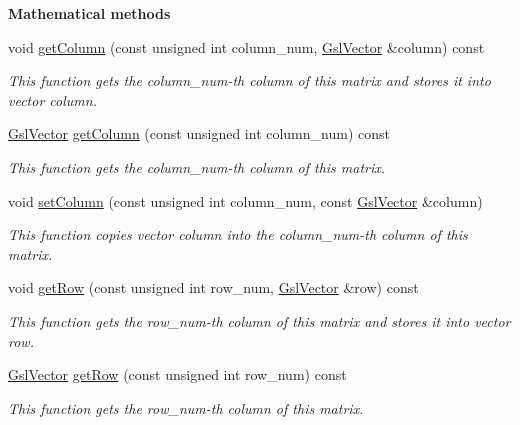 \begin{Indent}{\bf Mathematical methods}
\begin{DoxyCompactItemize}
void \hyperlink{class_q_u_e_s_o_1_1_gsl_matrix_a66db756823b03b5a66814c6868317669}{get\-Column} (const unsigned int column\-\_\-num, \hyperlink{class_q_u_e_s_o_1_1_gsl_vector}{Gsl\-Vector} \&column) const 
\begin{DoxyCompactList}\small\item\em This function gets the column\-\_\-num-\/th column of {\ttfamily this} matrix and stores it into vector {\ttfamily column}. \end{DoxyCompactList}\item 
\hyperlink{class_q_u_e_s_o_1_1_gsl_vector}{Gsl\-Vector} \hyperlink{class_q_u_e_s_o_1_1_gsl_matrix_a75ab1a16a4e40491f764eb95da2318ef}{get\-Column} (const unsigned int column\-\_\-num) const 
\begin{DoxyCompactList}\small\item\em This function gets the column\-\_\-num-\/th column of {\ttfamily this} matrix. \end{DoxyCompactList}\item 
void \hyperlink{class_q_u_e_s_o_1_1_gsl_matrix_acec53efb5d0e70233a5acc326734493e}{set\-Column} (const unsigned int column\-\_\-num, const \hyperlink{class_q_u_e_s_o_1_1_gsl_vector}{Gsl\-Vector} \&column)
\begin{DoxyCompactList}\small\item\em This function copies vector {\ttfamily column} into the column\-\_\-num-\/th column of {\ttfamily this} matrix. \end{DoxyCompactList}\item 
void \hyperlink{class_q_u_e_s_o_1_1_gsl_matrix_a94d2c6ffbc17b02403dd407600aed9fe}{get\-Row} (const unsigned int row\-\_\-num, \hyperlink{class_q_u_e_s_o_1_1_gsl_vector}{Gsl\-Vector} \&row) const 
\begin{DoxyCompactList}\small\item\em This function gets the row\-\_\-num-\/th column of {\ttfamily this} matrix and stores it into vector {\ttfamily row}. \end{DoxyCompactList}\item 
\hyperlink{class_q_u_e_s_o_1_1_gsl_vector}{Gsl\-Vector} \hyperlink{class_q_u_e_s_o_1_1_gsl_matrix_a0fdd155a0c71945fa6592f6b02876ea6}{get\-Row} (const unsigned int row\-\_\-num) const 
\begin{DoxyCompactList}\small\item\em This function gets the row\-\_\-num-\/th column of {\ttfamily this} matrix. \end{DoxyCompactList}\item 

\end{DoxyCompactItemize}
\end{Indent}
